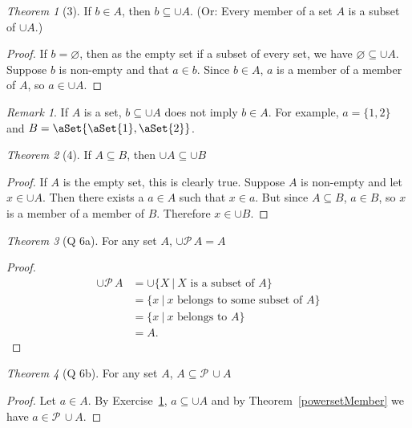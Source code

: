 \documentclass[12pt]{article}
\theoremstyle{plain}
\theoremstyle{remark}
\newtheorem*{exthm}{Theorem}
\theoremstyle{definition}
\theoremstyle{remark}
\newtheorem*{remark}{Remark}
\newcommand{\powerset}{\mathscr{P}\,}
\DeclarePairedDelimiter\aSet\{\}
\begin{document}
\begin{exthm}[3]\label{memberUnion}
 If $b \in A$, then $b \subseteq \cup A$. (Or: Every member of a set $A$ is a subset of $\cup A$.)
\end{exthm}
\begin{proof}
 If $b = \varnothing$, then as the empty set if a subset of every set, we have $\varnothing \subseteq \cup A$.  Suppose $b$ is non-empty and that $a \in b$. Since $b \in A$, $a$ is a member of a member of $A$, so $a \in \cup A$.
\end{proof}
\begin{remark}
 If $A$ is a set, $b \subseteq \cup A$ does not imply $b \in A$. For example, $a = \{1,2\}$ and $B = \aSet{\aSet{1}, \aSet{2}}$.
\end{remark}

\begin{exthm}[4]
 If $A \subseteq B$, then $\cup A \subseteq \cup B$
\end{exthm}
\begin{proof}
 If $A$ is the empty set, this is clearly true. Suppose $A$ is non-empty and let $x \in \cup A$. Then there exists a $a \in A$ such that $x \in a$. But since $A \subseteq B$, $a \in B$, so $x$ is a member of a member of $B$. Therefore $x \in \cup B$.
\end{proof}

\begin{exthm}[Q 6a]
 For any set $A$, $\cup \powerset A = A$
\end{exthm}
\begin{proof}
 \begin{align*}
  \cup \powerset A &= \cup \{X\ |\ \text{$X$ is a subset of $A$} \}\\
                   &= \{x\ |\ \text{$x$ belongs to some subset of $A$}\}\\
                   &= \{x\ |\ \text{$x$ belongs to $A$}\}\\
                   &= A.
 \end{align*}
\end{proof}

\begin{exthm}[Q 6b]
 For any set $A$, $A \subseteq \powerset \cup A$
\end{exthm}
\begin{proof}
 Let $a \in A$. By Exercise~\ref{memberUnion}, $a \subseteq \cup A$ and by Theorem~\ref{powersetMember} we have $a \in \powerset \cup A$.
\end{proof}
\end{document}
